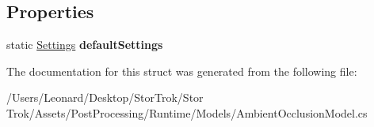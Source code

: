 \subsection*{Properties}
\begin{DoxyCompactItemize}
\item 
\mbox{\label{struct_unity_engine_1_1_post_processing_1_1_ambient_occlusion_model_1_1_settings_a1a2d8b2ae93f327b3365648d7abf25f1}} 
static \hyperlink{struct_unity_engine_1_1_post_processing_1_1_ambient_occlusion_model_1_1_settings}{Settings} {\bfseries default\+Settings}
\end{DoxyCompactItemize}


The documentation for this struct was generated from the following file\+:\begin{DoxyCompactItemize}
\item 
/\+Users/\+Leonard/\+Desktop/\+Stor\+Trok/\+Stor Trok/\+Assets/\+Post\+Processing/\+Runtime/\+Models/Ambient\+Occlusion\+Model.\+cs\end{DoxyCompactItemize}
